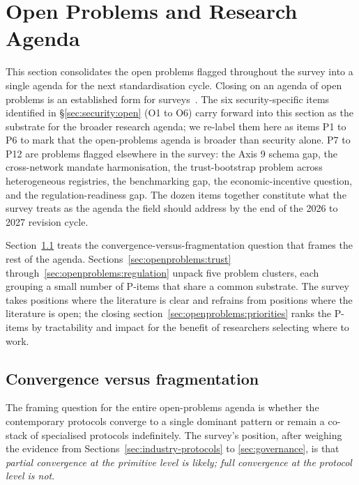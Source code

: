 \section{Open Problems and Research Agenda}
\label{sec:openproblems}

This section consolidates the open problems flagged
throughout the survey into a single agenda for the next
standardisation cycle. Closing on an agenda of open problems
is an established form for surveys~\cite{parkerholder2022autorl}. The six security-specific items
identified in \S\ref{sec:security:open} (O1 to O6) carry
forward into this section as the substrate for the
broader research agenda; we re-label them here as items
P1 to P6 to mark that the open-problems agenda is broader
than security alone. P7 to P12 are problems flagged
elsewhere in the survey: the Axis 9 schema gap, the
cross-network mandate harmonisation, the trust-bootstrap
problem across heterogeneous registries, the
benchmarking gap, the economic-incentive question, and
the regulation-readiness gap. The dozen items together
constitute what the survey treats as the agenda the
field should address by the end of the 2026 to 2027
revision cycle.

Section~\ref{sec:openproblems:convergence} treats the
convergence-versus-fragmentation question that frames the
rest of the agenda. Sections~\ref{sec:openproblems:trust}
through~\ref{sec:openproblems:regulation} unpack five
problem clusters, each grouping a small number of P-items
that share a common substrate. The survey takes positions
where the literature is clear and refrains from positions
where the literature is open; the closing
section~\ref{sec:openproblems:priorities} ranks the
P-items by tractability and impact for the benefit of
researchers selecting where to work.

\subsection{Convergence versus fragmentation}
\label{sec:openproblems:convergence}

The framing question for the entire open-problems agenda
is whether the contemporary protocols converge to a
single dominant pattern or remain a co-stack of
specialised protocols indefinitely. The survey's
position, after weighing the evidence from
Sections~\ref{sec:industry-protocols} to \ref{sec:governance},
is that \emph{partial convergence at the primitive level
is likely; full convergence at the protocol level is not}.

